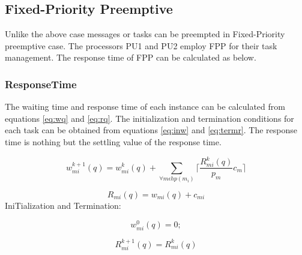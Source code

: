 \subsection{Fixed-Priority Preemptive}
Unlike the above case messages or tasks can be preempted in Fixed-Priority preemptive case. The processors PU1 and PU2 employ FPP for their task management. The response time of FPP can be calculated as below.
\subsubsection{ResponseTime}
The waiting time and response time of each instance can be calculated from equations \ref{eq:wq} and \ref{eq:rq}. The initialization and termination conditions for each task can be obtained from equations \ref{eq:inw} and \ref{eq:termr}. The response time is nothing but the settling value of the response time.  


\begin{equation}
w_{mi}^{k+1}(q)=w_{mi}^{k}(q)+\sum_{\forall m\epsilon hp(m_i)}\lceil \frac{R_{mi}^k(q)}{p_{m}}c_m \rceil
\label{eq:wq}
\end{equation}

\begin{equation}
R_{mi}(q)=w_{mi}(q)+c_{mi}
\label{eq:rq}
\end{equation}
IniTialization and Termination:

\begin{equation}
w_{mi}^{0}(q)=0;
\label{eq:inw}
\end{equation}

\begin{equation}
R_{mi}^{k+1}(q)=R_{mi}^{k}(q)
\label{eq:termr}
\end{equation}



